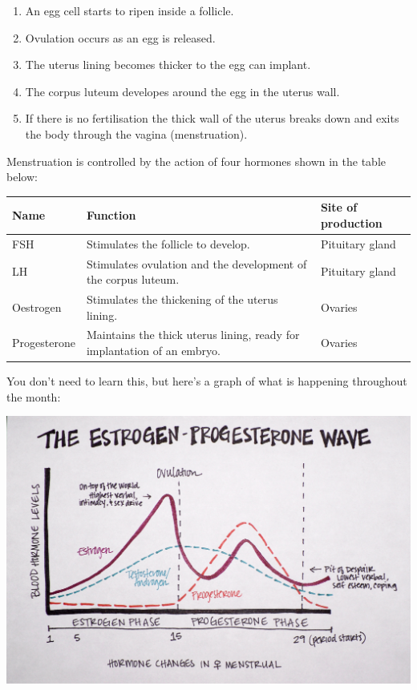 \documentclass{article}
\begin{document}
\begin{enumerate}

	\item An egg cell starts to ripen inside a follicle.

	\item Ovulation occurs as an egg is released.

	\item The uterus lining becomes thicker to the egg can implant.

	\item The corpus luteum developes around the egg in the uterus wall.

	\item If there is no fertilisation the thick wall of the uterus breaks down
	and exits the body through the vagina (menstruation).

\end{enumerate}

Menstruation is controlled by the action of four hormones shown in the table
below:

\begin{center}
	\begin{tabular}{|l|p{5cm}|l|}
		\hline

		{\bf Name} & {\bf Function} & {\bf Site of production}\\ \hline

		FSH & Stimulates the follicle to develop. & Pituitary gland\\ \hline

		LH & Stimulates ovulation and the development of the corpus luteum. &
		Pituitary gland\\ \hline

		Oestrogen & Stimulates the thickening of the uterus lining. & Ovaries\\ \hline

		Progesterone & Maintains the thick uterus lining, ready for implantation
		of an embryo. & Ovaries\\ \hline

	\end{tabular}
\end{center}

You don't need to learn this, but here's a graph of what is happening throughout
the month:

\begin{center}
	\includegraphics[angle=0,scale=0.15]{menstrual_cycle}
\end{center}
\end{document}
